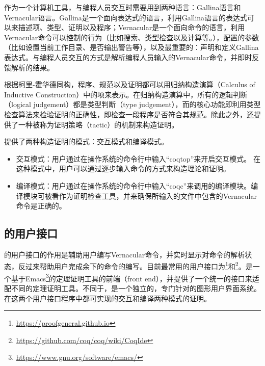 作为一个计算机工具，与编程人员交互时需要用到两种语言：Gallina语言和Vernacular语言。Gallina是一个面向表达式的语言，利用Gallina语言的表达式可以来描述项、类型、证明以及程序；Vernacular是一个面向命令的语言，利用Vernacular命令可以控制的行为（比如搜索、类型检查以及计算等。），配置的参数（比如设置当前工作目录、是否输出警告等），以及最重要的：声明和定义Gallina表达式。与编程人员交互的方式是解析编程人员输入的Vernacular命令，并即时反馈解析的结果。


根据柯里-霍华德同构，程序、规范以及证明都可以用归纳构造演算（Calculus of Inductive Construction）\cite{BertotC04}中的项来表示。在归纳构造演算中，所有的逻辑判断（logical judgement）都是类型判断（type judgement），而的核心功能即利用类型检查算法来检验证明的正确性，即检查一段程序是否符合其规范。除此之外，还提供了一种被称为证明策略（tactic）的机制来构造证明。

提供了两种构造证明的模式：交互模式和编译模式。
\begin{itemize}
	\item 交互模式：用户通过在操作系统的命令行中输入“coqtop”来开启交互模式。
	在这种模式中，用户可以通过逐步输入命令的方式来构造理论和证明。
	\item 编译模式：用户通过在操作系统的命令行中输入“coqc”来调用的编译模块。编译模块可被看作为证明检查工具，并来确保所输入的文件中包含的Vernacular命令是正确的。
\end{itemize}

\subsection{的用户接口}
的用户接口的作用是辅助用户编写Vernacular命令，并实时显示对命令的解析状态，反过来帮助用户完成余下的命令的编写。目前最常用的用户接口为\footnote{\url{https://proofgeneral.github.io}}和\footnote{\url{https://github.com/coq/coq/wiki/CoqIde}}。是一个基于Emacs\footnote{\url{https://www.gnu.org/software/emacs/}}的定理证明工具的前端（front end），并提供了一个统一的接口来适配不同的定理证明工具。不同于，是一个独立的，专门针对的图形用户界面系统。
在这两个用户接口程序中都可实现的交互和编译两种模式的证明。

